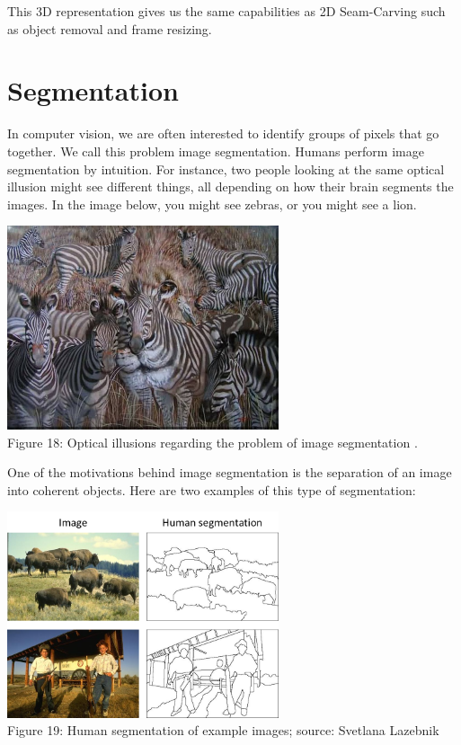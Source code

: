 \documentclass{article}
\begin{document}
This 3D representation gives us the same capabilities as 2D Seam-Carving such as object removal and frame resizing.
\section{Segmentation}
In computer vision, we are often interested to identify groups of pixels that go together. We call this problem image segmentation. Humans perform image segmentation by intuition. For instance, two people looking at the same optical illusion might see different things, all depending on how their brain segments the images. In the image below, you might see zebras, or you might see a lion.
\begin{center}
\includegraphics[width=8cm]{lion.jpg} \\
Figure 18: Optical illusions regarding the problem of image segmentation \cite{illusion}.
\end{center}

One of the motivations behind image segmentation is the separation of an image into coherent objects. Here are two examples of this type of segmentation:

\begin{center}
\includegraphics[width=8cm]{objects.png} \\
Figure 19:  Human segmentation of example images; source: Svetlana Lazebnik
\end{center}
\end{document}
